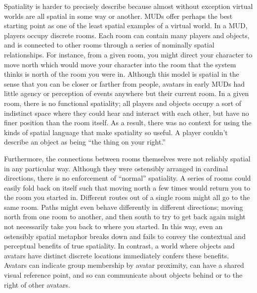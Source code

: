 Spatiality is harder to precisely describe because almost without exception virtual worlds are all spatial in some way or another. MUDs offer perhaps the best starting point as one of the least spatial examples of a virtual world. In a MUD, players occupy discrete rooms. Each room can contain many players and objects, and is connected to other rooms through a series of nominally spatial relationships. For instance, from a given room, you might direct your character to move north which would move your character into the room that the system thinks is north of the room you were in. Although this model is spatial in the sense that you can be closer or farther from people, avatars in early MUDs had little agency or perception of events anywhere but their current room. In a given room, there is no functional spatiality; all players and objects occupy a sort of indistinct space where they could hear and interact with each other, but have no finer position than the room itself. As a result, there was no context for using the kinds of spatial language that make spatiality so useful. A player couldn't describe an object as being ``the thing on your right.''

Furthermore, the connections between rooms themselves were not reliably spatial in any particular way. Although they were ostensibly arranged in cardinal directions, there is no enforcement of ``normal'' spatiality. A series of rooms could easily fold back on itself such that moving north a few times would return you to the room you started in. Different routes out of a single room might all go to the same room. Paths might even behave differently in different directions; moving north from one room to another, and then south to try to get back again might not necessarily take you back to where you started. In this way, even an ostensibly spatial metaphor breaks down and fails to convey the contextual and perceptual benefits of true spatiality. In contrast, a world where objects and avatars have distinct discrete locations immediately confers these benefits. Avatars can indicate group membership by avatar proximity, can have a shared visual reference point, and so can communicate about objects behind or to the right of other avatars. 


